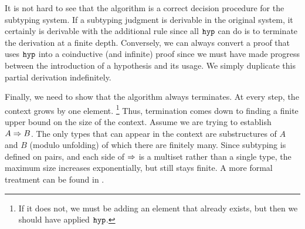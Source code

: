 It is not hard to see that the algorithm is a correct decision procedure for the subtyping system. If a subtyping judgment is derivable in the original system, it certainly is derivable with the additional rule since all $\texttt{hyp}$ can do is to terminate the derivation at a finite depth. Conversely, we can always convert a proof that uses $\texttt{hyp}$ into a coinductive (and infinite) proof since we must have made progress between the introduction of a hypothesis and its usage. We simply duplicate this partial derivation indefinitely.

Finally, we need to show that the algorithm always terminates. At every step, the context grows by one element.%
\footnote{If it does not, we must be adding an element that already exists, but then we should have applied $\texttt{hyp}$.}
Thus, termination comes down to finding a finite upper bound on the size of the context. Assume we are trying to establish $A \mathrel\Rightarrow B$. The only types that can appear in the context are substructures of $A$ and $B$ (modulo unfolding) of which there are finitely many. Since subtyping is defined on pairs, and each side of $\mathrel\Rightarrow$ is a multiset  rather than a single type, the maximum size increases exponentially, but still stays finite. A more formal treatment can be found in \cite{StoneS05}. 

